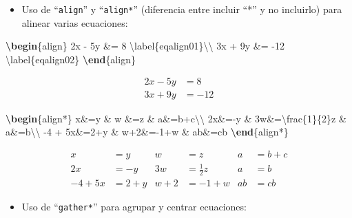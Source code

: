 \documentclass[12pt,a4paper,oneside,]{article}
\newenvironment{Shaded}{\begin{snugshade}}{\end{snugshade}}
\newcommand{\ExtensionTok}[1]{#1}
\newcommand{\KeywordTok}[1]{\textcolor[rgb]{0.13,0.29,0.53}{\textbf{#1}}}
\newcommand{\NormalTok}[1]{#1}
\newcommand{\SpecialCharTok}[1]{\textcolor[rgb]{0.00,0.00,0.00}{#1}}
\newcommand{\SpecialStringTok}[1]{\textcolor[rgb]{0.31,0.60,0.02}{#1}}
\providecommand{\tightlist}{%
  \setlength{\itemsep}{0pt}\setlength{\parskip}{0pt}}
\numberwithin{dummy}{section}
\theoremstyle{ocrenumbox}
\theoremstyle{blacknumex}
\theoremstyle{blacknumbox}
\theoremstyle{ocrenum}
\theoremstyle{ocrenum}
\begin{document}
\begin{itemize}
\tightlist
\item
  Uso de ``\texttt{align}'' y ``\texttt{align*}'' (diferencia entre
  incluir ``*'' y no incluirlo) para alinear varias ecuaciones:
\end{itemize}

\begin{Shaded}
\begin{Highlighting}[]
\KeywordTok{\textbackslash{}begin}\NormalTok{\{}\ExtensionTok{align}\NormalTok{\}}\SpecialStringTok{ }
\SpecialStringTok{2x {-} 5y \&=  8  }\SpecialCharTok{\textbackslash{}label}\SpecialStringTok{\{eqalign01\}}\SpecialCharTok{\textbackslash{}\textbackslash{}}\SpecialStringTok{ }
\SpecialStringTok{3x + 9y \&=  {-}12 }\SpecialCharTok{\textbackslash{}label}\SpecialStringTok{\{eqalign02\}}
\KeywordTok{\textbackslash{}end}\NormalTok{\{}\ExtensionTok{align}\NormalTok{\}}
\end{Highlighting}
\end{Shaded}

\begin{align} 
2x - 5y &=  8  \label{eqalign01}\\ 
3x + 9y &=  -12 \label{eqalign02}
\end{align}

\begin{Shaded}
\begin{Highlighting}[]
\KeywordTok{\textbackslash{}begin}\NormalTok{\{}\ExtensionTok{align*}\NormalTok{\}}
\SpecialStringTok{x\&=y           \&  w \&=z              \&  a\&=b+c}\SpecialCharTok{\textbackslash{}\textbackslash{}}
\SpecialStringTok{2x\&={-}y         \&  3w\&=}\SpecialCharTok{\textbackslash{}frac}\SpecialStringTok{\{1\}\{2\}z   \&  a\&=b}\SpecialCharTok{\textbackslash{}\textbackslash{}}
\SpecialStringTok{{-}4 + 5x\&=2+y   \&  w+2\&={-}1+w          \&  ab\&=cb}
\KeywordTok{\textbackslash{}end}\NormalTok{\{}\ExtensionTok{align*}\NormalTok{\}}
\end{Highlighting}
\end{Shaded}

\begin{align*}
x&=y           &  w &=z              &  a&=b+c\\
2x&=-y         &  3w&=\frac{1}{2}z   &  a&=b\\
-4 + 5x&=2+y   &  w+2&=-1+w          &  ab&=cb
\end{align*}

\begin{itemize}
\tightlist
\item
  Uso de ``\texttt{gather*}'' para agrupar y centrar ecuaciones:
\end{itemize}
\end{document}
